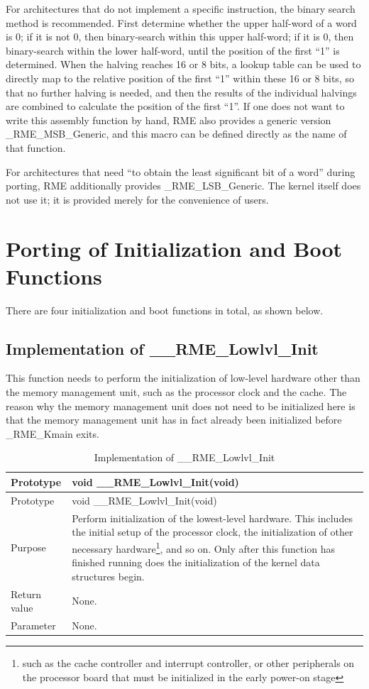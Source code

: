 For architectures that do not implement a specific instruction, the binary search method is recommended. First determine whether the upper half-word of a word is 0; if it is not 0, then binary-search within this upper half-word; if it is 0, then binary-search within the lower half-word, until the position of the first ``1'' is determined. When the halving reaches 16 or 8 bits, a lookup table can be used to directly map to the relative position of the first ``1'' within these 16 or 8 bits, so that no further halving is needed, and then the results of the individual halvings are combined to calculate the position of the first ``1''. If one does not want to write this assembly function by hand, RME also provides a generic version \_RME\_MSB\_Generic, and this macro can be defined directly as the name of that function.

For architectures that need ``to obtain the least significant bit of a word'' during porting, RME additionally provides \_RME\_LSB\_Generic. The kernel itself does not use it; it is provided merely for the convenience of users.

\section{Porting of Initialization and Boot Functions}\label{sec:7-init-and-boot-function-porting}

There are four initialization and boot functions in total, as shown below.

\subsection{Implementation of \_\_RME\_Lowlvl\_Init}\label{subsec:7-rme-lowlvl-init-implementation}

This function needs to perform the initialization of low-level hardware other than the memory management unit, such as the processor clock and the cache. The reason why the memory management unit does not need to be initialized here is that the memory management unit has in fact already been initialized before \_RME\_Kmain exits.

\begin{xltabular}{\textwidth}{@{}>{\hsize\raggedright\arraybackslash}X>{\hsize\raggedright\arraybackslash}X@{}}
\caption{Implementation of \_\_RME\_Lowlvl\_Init}\label{tab:7-35-rme-lowlvl-init-implementation}\\
\toprule
Prototype & void \_\_RME\_Lowlvl\_Init(void)\tabularnewline
\endfirsthead
\toprule
Prototype & void \_\_RME\_Lowlvl\_Init(void)\tabularnewline
\midrule
\endhead
\bottomrule
\endlastfoot
Purpose &
Perform initialization of the lowest-level hardware. This includes the initial setup of the processor clock, the initialization of other necessary hardware\footnote{such as the cache controller and interrupt controller, or other peripherals on the processor board that must be initialized in the early power-on stage}, and so on. Only after this function has finished running does the initialization of the kernel data structures begin.\tabularnewline
Return value & None.\tabularnewline
Parameter & None.\tabularnewline
\end{xltabular}
\nopagebreak[4]

